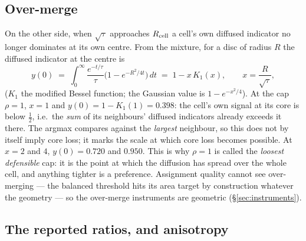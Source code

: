 \documentclass[11pt,a4paper]{article}
\begin{document}
\subsection{Over-merge}
\label{sec:overmerge}

On the other side, when $\sqrt\tau$ approaches $R_{\mathrm{cell}}$ a cell's own diffused
indicator no longer dominates at its own centre. From the mixture, for a disc of
radius $R$ the diffused indicator at the centre is
\begin{equation}
  y(0) \;=\; \int_0^\infty \frac{e^{-t/\tau}}{\tau}\bigl(1 - e^{-R^2/4t}\bigr)\, dt
  \;=\; 1 - x\, K_1(x), \qquad x = \frac{R}{\sqrt\tau},
  \label{eq:centre}
\end{equation}
($K_1$ the modified Bessel function; the Gaussian value is $1 - e^{-x^2/4}$).
At the cap $\rho = 1$, $x = 1$ and $y(0) = 1 - K_1(1) = 0.398$: the cell's own
signal at its core is below $\tfrac12$, i.e.\ the \emph{sum} of its neighbours'
diffused indicators already exceeds it there. The argmax compares against the
\emph{largest} neighbour, so this does not by itself imply core loss; it marks
the scale at which core loss becomes possible. At $x = 2$ and $4$, $y(0) = 0.720$ and $0.950$.
This is why $\rho = 1$ is called the \emph{loosest defensible} cap: it is the
point at which the diffusion has spread over the whole cell, and anything
tighter is a preference. Assignment quality cannot see over-merging --- the
balanced threshold hits its area target by construction whatever the geometry ---
so the over-merge instruments are geometric (\S\ref{sec:instruments}).

\subsection{The reported ratios, and anisotropy}
\label{sec:ratios}
\end{document}
